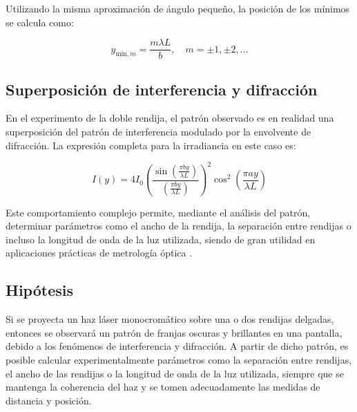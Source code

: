 \documentclass[article,12pt]{elsarticle}
\begin{document}
Utilizando la misma aproximación de ángulo pequeño, la posición de los mínimos se calcula como:

\begin{equation}
y_{\text{min}, m} = \frac{m \lambda L}{b}, \quad m = \pm1, \pm2, \ldots \label{eq26}
\end{equation}
\cite{barrios2025interferencia}

\subsection*{Superposición de interferencia y difracción}

En el experimento de la doble rendija, el patrón observado es en realidad una superposición del patrón de interferencia modulado por la envolvente de difracción. La expresión completa para la irradiancia en este caso es:

\begin{equation}
I(y) = 4I_0 \left( \frac{\sin \left( \frac{\pi b y}{\lambda L} \right)}{\left( \frac{\pi b y}{\lambda L} \right)} \right)^2 \cos^2 \left( \frac{\pi a y}{\lambda L} \right) \label{eq27}
\end{equation}
\cite{barrios2025interferencia}

Este comportamiento complejo permite, mediante el análisis del patrón, determinar parámetros como el ancho de la rendija, la separación entre rendijas o incluso la longitud de onda de la luz utilizada, siendo de gran utilidad en aplicaciones prácticas de metrología óptica \cite{hecht2000optica, barrios2025interferencia}.



\subsection{Hipótesis}
Si se proyecta un haz láser monocromático sobre una o dos rendijas delgadas, entonces se observará un patrón de franjas oscuras y brillantes en una pantalla, debido a los fenómenos de interferencia y difracción. A partir de dicho patrón, es posible calcular experimentalmente parámetros como la separación entre rendijas, el ancho de las rendijas o la longitud de onda de la luz utilizada, siempre que se mantenga la coherencia del haz y se tomen adecuadamente las medidas de distancia y posición.
\end{document}

